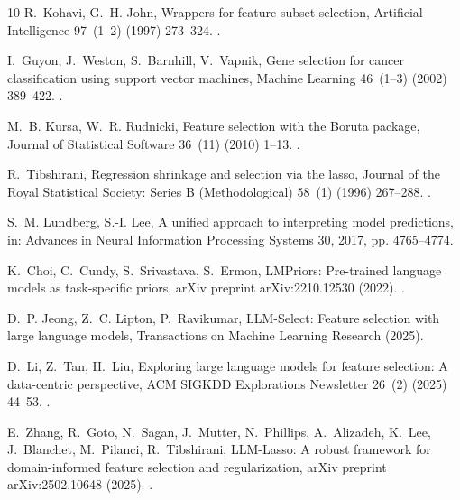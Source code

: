 \documentclass[final,5p,twocolumn]{elsarticle}
\begin{document}
\begin{thebibliography}{10}
R.~Kohavi, G.~H. John, Wrappers for feature subset selection, Artificial
  Intelligence 97~(1--2) (1997) 273--324.
\newblock \href {https://doi.org/10.1016/S0004-3702(97)00043-X}
  {}.

I.~Guyon, J.~Weston, S.~Barnhill, V.~Vapnik, Gene selection for cancer
  classification using support vector machines, Machine Learning 46~(1--3)
  (2002) 389--422.
\newblock \href {https://doi.org/10.1023/A:1012487302797}
  {}.

M.~B. Kursa, W.~R. Rudnicki, Feature selection with the {B}oruta package,
  Journal of Statistical Software 36~(11) (2010) 1--13.
\newblock \href {https://doi.org/10.18637/jss.v036.i11}
  {}.

R.~Tibshirani, Regression shrinkage and selection via the lasso, Journal of the
  Royal Statistical Society: Series B (Methodological) 58~(1) (1996) 267--288.
\newblock \href {https://doi.org/10.1111/j.2517-6161.1996.tb02080.x}
  {}.

S.~M. Lundberg, S.-I. Lee, A unified approach to interpreting model
  predictions, in: Advances in Neural Information Processing Systems 30, 2017,
  pp. 4765--4774.

K.~Choi, C.~Cundy, S.~Srivastava, S.~Ermon, {LMPriors}: Pre-trained language
  models as task-specific priors, arXiv preprint arXiv:2210.12530 (2022).
\newblock \href {https://doi.org/10.48550/arXiv.2210.12530}
  {}.

D.~P. Jeong, Z.~C. Lipton, P.~Ravikumar, {LLM-Select}: Feature selection with
  large language models, Transactions on Machine Learning Research (2025).

D.~Li, Z.~Tan, H.~Liu, Exploring large language models for feature selection: A
  data-centric perspective, ACM SIGKDD Explorations Newsletter 26~(2) (2025)
  44--53.
\newblock \href {https://doi.org/10.1145/3715073.3715077}
  {}.

E.~Zhang, R.~Goto, N.~Sagan, J.~Mutter, N.~Phillips, A.~Alizadeh, K.~Lee,
  J.~Blanchet, M.~Pilanci, R.~Tibshirani, {LLM-Lasso}: A robust framework for
  domain-informed feature selection and regularization, arXiv preprint
  arXiv:2502.10648 (2025).
\newblock \href {https://doi.org/10.48550/arXiv.2502.10648}
  {}.


\end{thebibliography}
\end{document}
